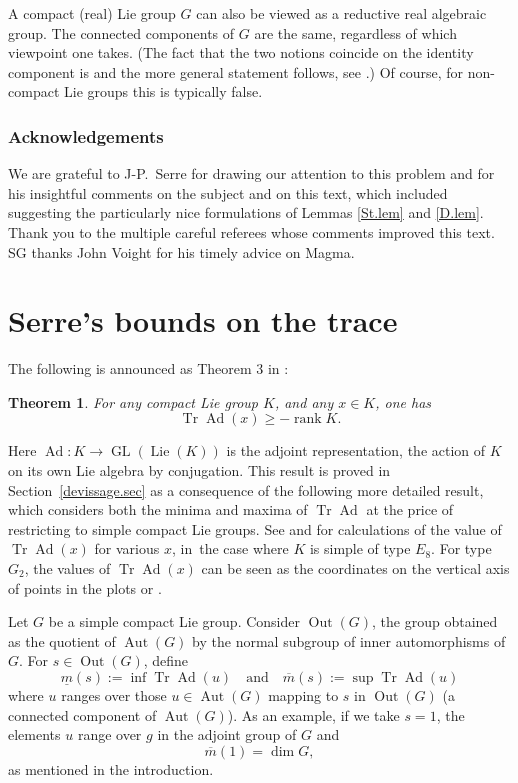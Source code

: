 \documentclass[JEP,XML,SOM,Unicode,NoFloatCountersInSection,published]{cedram}
\newtheorem{thm}[equation]{Theorem}
\theoremstyle{definition}
\newcommand{\eand}{\quad\text{and}\quad}
\newcommand{\mmin}{\underline{m}}
\newcommand{\mmax}{\overline{m}}
\DeclareMathOperator{\GL}{GL}
\DeclareMathOperator{\Tr}{Tr}
\DeclareMathOperator{\Ad}{Ad}
\DeclareMathOperator{\Lie}{Lie}
\DeclareMathOperator{\Aut}{Aut}
\DeclareMathOperator{\Out}{Out}
\DeclareMathOperator{\rank}{rank}
\begin{document}
A compact (real) Lie group $G$ can also be viewed as a reductive real algebraic group. The connected components of $G$ are the same, regardless of which viewpoint one takes. (The fact that the two notions coincide on the identity component is \cite[24.6(ii)]{Borel} and the more general statement follows, see \cite{Conrad:cpt}.) Of course, for non-compact Lie groups this is typically false.

\subsubsection*{Acknowledgements} We are grateful to J-P.~Serre for drawing our attention to this problem and for his insightful comments on the subject and on this text, which included suggesting the particularly nice formulations of Lemmas \ref{St.lem} and \ref{D.lem}. Thank you to the multiple careful referees whose comments improved this text. SG thanks John Voight for his timely advice on Magma.

\section{Serre's bounds on the trace} \label{serre.bounds}
The following is announced as Theorem 3 in \cite{Se:trace}:

\begin{thm} \label{devissage.cor}
For any compact Lie group $K$, and any $x \in K$, one has
\[
\Tr \Ad(x) \ge -\rank K.
\]
\end{thm}

Here $\Ad \colon K \to \GL(\Lie(K))$ is the adjoint representation, the action of $K$ on its own Lie algebra by conjugation. This result is proved in Section~\ref{devissage.sec} as a consequence of the following more detailed result, which considers both the minima and maxima of $\Tr \Ad$ at the price of restricting to simple compact Lie groups. See \cite{FreyGriess} and \cite{Frey} for calculations of the value of $\Tr \Ad(x)$ for various $x$, in~the case where $K$ is simple of type $E_8$. For type $G_2$, the values of $\Tr \Ad(x)$ can be seen as the coordinates on the vertical axis of points in the plots \cite[Fig.\,4]{Lachaud:G2} or \cite[Figs.\,3,\,5]{G:serrepics}.

Let $G$ be a simple compact Lie group. Consider $\Out(G)$, the group obtained as the quotient of $\Aut(G)$ by the normal subgroup of inner automorphisms of $G$. For $s \in \Out(G)$, define
\[
\mmin(s) := \inf \Tr \Ad(u) \eand \mmax(s) := \sup \Tr \Ad(u)
\]
where $u$ ranges over those $u \in \Aut(G)$ mapping to $s$ in $\Out(G)$ (a connected component of $\Aut(G)$). As an example, if we take $s = 1$, the elements $u$ range over $g$ in the adjoint group of $G$ and
\begin{equation} \label{max1}
\mmax(1) = \dim G,
\end{equation}
as mentioned in the introduction.
\end{document}
